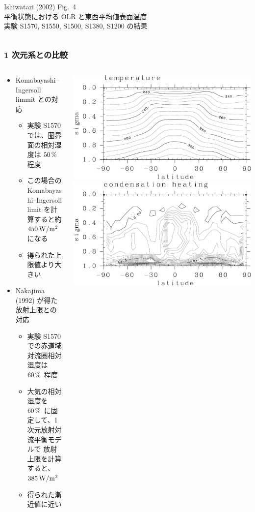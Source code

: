\documentclass[aspectratio=149,9pt,]{beamer}
\begin{document}
\begin{frame}
\begin{columns}[T,onlytextwidth]
\begin{column}{.4\textwidth}
			\scriptsize Ishiwatari \etal (2002) Fig.\ 4\\
			平衡状態における OLR と東西平均値表面温度\\
			実験 S1570, S1550, S1500, S1380, S1200 の結果
		\end{column}
	\end{columns}
\end{frame}

\begin{frame}
	\frametitle{1 次元系との比較}
	\begin{columns}[T,onlytextwidth]
		\begin{column}{.45\textwidth}
			\begin{itemize}
				\item Komabayashi--Ingersoll limmit との対応
					\begin{itemize}
						\item 実験 S1570 では、圏界面の相対湿度は \(50\hmu{\%}\) 程度
						\item この場合の Komabayashi--Ingersoll limit を計算すると約 \(450\hmu{W/m^2}\) になる
						\item 得られた上限値より大きい
					\end{itemize}
				\item Nakajima \etal (1992) が得た放射上限との対応
					\begin{itemize}
						\item 実験 S1570 での赤道域対流圏相対湿度は \(60\hmu{\%}\) 程度
						\item 大気の相対湿度を \(60\hmu{\%}\) に固定して、1 次元放射対流平衡モデルで
							放射上限を計算すると、\(385\hmu{W/m^2}\)
						\item 得られた漸近値に近い
					\end{itemize}
			\end{itemize}
		\end{column}
		\begin{column}{.5\textwidth}
			\centering
			\includegraphics[width=.45\textwidth]{./fig/157-T-meri.kps-crop.pdf}
			\includegraphics[width=.45\textwidth]{./fig/157-Qcnd-meri.kps-crop.pdf}

\end{column}
\end{columns}
\end{frame}
\end{document}
